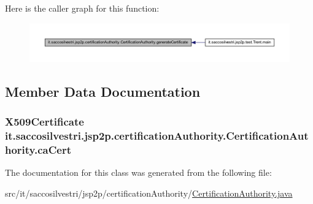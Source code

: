 \-Here is the caller graph for this function\-:
\nopagebreak
\begin{figure}[H]
\begin{center}
\leavevmode
\includegraphics[width=350pt]{classit_1_1saccosilvestri_1_1jsp2p_1_1certification_authority_1_1_certification_authority_acac40170eef762342866fedbee961113_icgraph}
\end{center}
\end{figure}




\subsection{\-Member \-Data \-Documentation}
\hypertarget{classit_1_1saccosilvestri_1_1jsp2p_1_1certification_authority_1_1_certification_authority_a778a02a715b6e7fdbcb65edb08c211e8}{
\subsubsection[{ca\-Cert}]{\setlength{\rightskip}{0pt plus 5cm}\-X509\-Certificate {\bf it.\-saccosilvestri.\-jsp2p.\-certification\-Authority.\-Certification\-Authority.\-ca\-Cert}}}
\label{classit_1_1saccosilvestri_1_1jsp2p_1_1certification_authority_1_1_certification_authority_a778a02a715b6e7fdbcb65edb08c211e8}


\-The documentation for this class was generated from the following file\-:\begin{DoxyCompactItemize}
\item 
src/it/saccosilvestri/jsp2p/certification\-Authority/\hyperlink{_certification_authority_8java}{\-Certification\-Authority.\-java}\end{DoxyCompactItemize}
